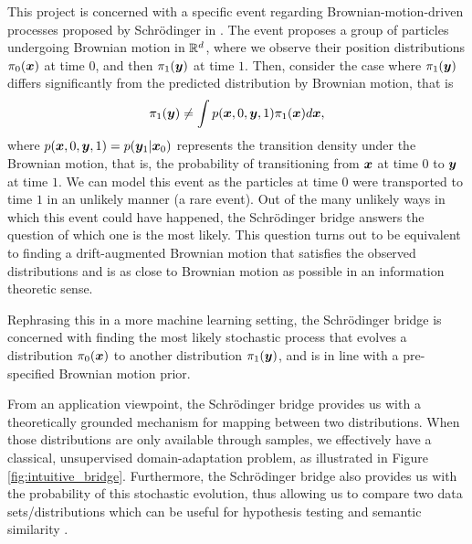 \documentclass[a4paper,12pt,twoside,openright]{report}
\theoremstyle{definition}
\begin{document}
 This project is concerned with a specific event regarding Brownian-motion-driven processes proposed by Schrödinger in \citep{schrodinger1931uber, schrodinger1932theorie} . The event proposes a group of particles undergoing Brownian motion in ${\mathbb{R}}^d$, where we observe their position distributions $\pi_0({\bm{x}})$ at time $0$, and then $\pi_1({\bm{y}})$ at time $1$. Then, consider the case where $\pi_1({\bm{y}})$ differs significantly from the predicted distribution by Brownian motion, that is
 \begin{align*}
     \pi_1({\bm{y}}) \neq \int p({\bm{x}}, 0, {\bm{y}} , 1) \pi_1({\bm{x}}) d{\bm{x}},
 \end{align*}
 where $p({\bm{x}}, 0, {\bm{y}} , 1) = p({\bm{y}}_1| {\bm{x}}_0)$ represents the transition density under the Brownian motion, that is, the probability of transitioning from ${\bm{x}}$ at time $0$ to ${\bm{y}}$ at time $1$. We can model this event as the particles at time $0$ were transported to time $1$ in an unlikely manner (a rare event). Out of the many unlikely ways in which this event could have happened, the Schrödinger bridge answers the question of which one is the most likely. This question turns out to be equivalent to finding a drift-augmented Brownian motion that satisfies the observed distributions and is as close to Brownian motion as possible in an information theoretic sense.
 
 Rephrasing this in a more machine learning setting, the Schrödinger bridge is concerned with finding the most likely stochastic process that evolves a distribution $\pi_0({\bm{x}})$ to another distribution $\pi_1({\bm{y}})$, and is in line with a pre-specified Brownian motion prior.
 
 From an application viewpoint, the Schrödinger bridge provides us with a theoretically grounded mechanism for mapping between two distributions. When those distributions are only available through samples, we effectively have a classical, unsupervised domain-adaptation problem, as illustrated in Figure \ref{fig:intuitive_bridge}. Furthermore, the Schrödinger bridge also provides us with the probability of this stochastic evolution, thus allowing us to compare two data sets/distributions which can be useful for hypothesis testing \citep{gretton2012kernel,ramdas2017wasserstein} and semantic similarity \citep{vargas2019model}.
 
\end{document}
